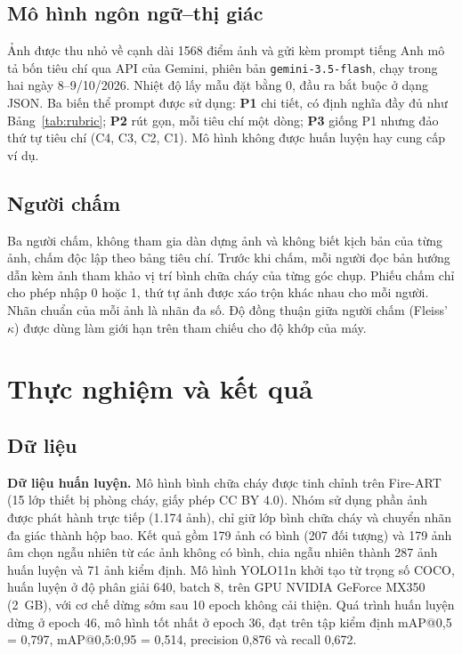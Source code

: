 \documentclass[conference]{IEEEtran}
\begin{document}
\subsection{Mô hình ngôn ngữ--thị giác}
Ảnh được thu nhỏ về cạnh dài 1568 điểm ảnh và gửi kèm prompt tiếng Anh mô tả bốn tiêu chí qua API của Gemini, phiên bản \texttt{gemini-3.5-flash}, chạy trong hai ngày 8--9/10/2026. Nhiệt độ lấy mẫu đặt bằng 0, đầu ra bắt buộc ở dạng JSON. Ba biến thể prompt được sử dụng: \textbf{P1} chi tiết, có định nghĩa đầy đủ như Bảng~\ref{tab:rubric}; \textbf{P2} rút gọn, mỗi tiêu chí một dòng; \textbf{P3} giống P1 nhưng đảo thứ tự tiêu chí (C4, C3, C2, C1). Mô hình không được huấn luyện hay cung cấp ví dụ.

\subsection{Người chấm}
Ba người chấm, không tham gia dàn dựng ảnh và không biết kịch bản của từng ảnh, chấm độc lập theo bảng tiêu chí. Trước khi chấm, mỗi người đọc bản hướng dẫn kèm ảnh tham khảo vị trí bình chữa cháy của từng góc chụp. Phiếu chấm chỉ cho phép nhập 0 hoặc 1, thứ tự ảnh được xáo trộn khác nhau cho mỗi người. Nhãn chuẩn của mỗi ảnh là nhãn đa số. Độ đồng thuận giữa người chấm (Fleiss' $\kappa$) được dùng làm giới hạn trên tham chiếu cho độ khớp của máy.

\section{Thực nghiệm và kết quả}

\subsection{Dữ liệu}
\textbf{Dữ liệu huấn luyện.} Mô hình bình chữa cháy được tinh chỉnh trên Fire-ART~\cite{wen2025fireart} (15 lớp thiết bị phòng cháy, giấy phép CC BY 4.0). Nhóm sử dụng phần ảnh được phát hành trực tiếp (1.174 ảnh), chỉ giữ lớp bình chữa cháy và chuyển nhãn đa giác thành hộp bao. Kết quả gồm 179 ảnh có bình (207 đối tượng) và 179 ảnh âm chọn ngẫu nhiên từ các ảnh không có bình, chia ngẫu nhiên thành 287 ảnh huấn luyện và 71 ảnh kiểm định. Mô hình YOLO11n khởi tạo từ trọng số COCO, huấn luyện ở độ phân giải 640, batch 8, trên GPU NVIDIA GeForce MX350 (2~GB), với cơ chế dừng sớm sau 10 epoch không cải thiện. Quá trình huấn luyện dừng ở epoch 46, mô hình tốt nhất ở epoch 36, đạt trên tập kiểm định mAP@0{,}5 = 0{,}797, mAP@0{,}5:0{,}95 = 0{,}514, precision 0{,}876 và recall 0{,}672.
\end{document}

